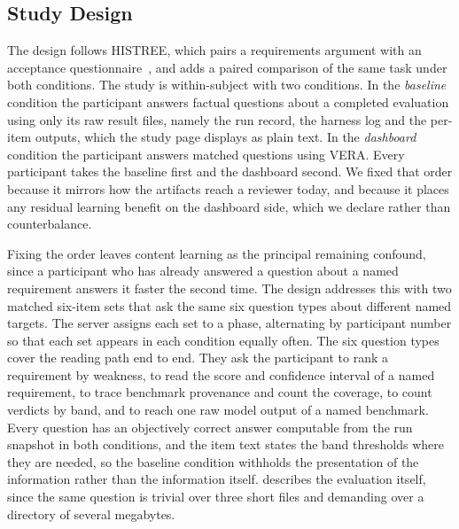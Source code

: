 \documentclass[10pt,conference]{IEEEtran}
\begin{document}
\subsection{Study Design}
The design follows HISTREE, which pairs a requirements argument with an acceptance questionnaire~\cite{studtmann2023histree,davis1989tam}, and adds a paired comparison of the same task under both conditions.
The study is within-subject with two conditions.
In the \emph{baseline} condition the participant answers factual questions about a completed evaluation using only its raw result files, namely the run record, the harness log and the per-item outputs, which the study page displays as plain text.
In the \emph{dashboard} condition the participant answers matched questions using VERA.
Every participant takes the baseline first and the dashboard second.
We fixed that order because it mirrors how the artifacts reach a reviewer today, and because it places any residual learning benefit on the dashboard side, which we declare rather than counterbalance.

Fixing the order leaves content learning as the principal remaining confound, since a participant who has already answered a question about a named requirement answers it faster the second time.
The design addresses this with two matched six-item sets that ask the same six question types about different named targets.
The server assigns each set to a phase, alternating by participant number so that each set appears in each condition equally often.
The six question types cover the reading path end to end.
They ask the participant to rank a requirement by weakness, to read the score and confidence interval of a named requirement, to trace benchmark provenance and count the coverage, to count verdicts by band, and to reach one raw model output of a named benchmark.
Every question has an objectively correct answer computable from the run snapshot in both conditions, and the item text states the band thresholds where they are needed, so the baseline condition withholds the presentation of the information rather than the information itself.
 describes the evaluation itself, since the same question is trivial over three short files and demanding over a directory of several megabytes.
\end{document}
